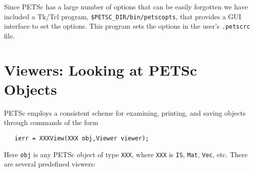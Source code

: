 Since PETSc has a large number of options that can be easily forgotten
we have included a Tk/Tcl program, {\tt \$PETSC\_DIR/bin/petscopts}, that
provides a GUI interface to set the options.  This program sets
the options in the user's {\tt .petscrc} file. 

\section{Viewers: Looking at PETSc Objects} \label{sec:viewers}

PETSc employs a consistent scheme for examining, printing, and 
saving objects through commands of the form
\begin{verbatim}
   ierr = XXXView(XXX obj,Viewer viewer);
\end{verbatim}
Here {\tt obj} is any PETSc object of type
{\tt XXX},  where {\tt XXX} 
is {\tt IS}, {\tt Mat}, {\tt Vec}, etc. There are several
predefined viewers:
